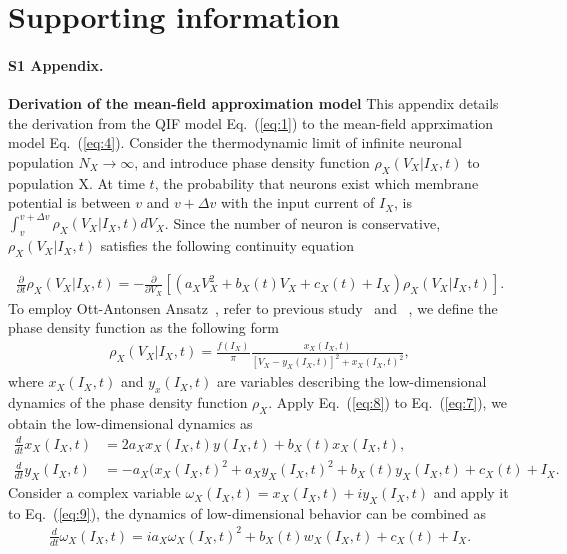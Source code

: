 \documentclass[10pt,letterpaper]{article}
\begin{document}
\section*{Supporting information}


\paragraph*{S1 Appendix.}
\label{S1_Appendix}
{\bf Derivation of the mean-field approximation model} This appendix details the derivation from the QIF model Eq.~(\ref{eq:1}) to the mean-field apprximation model Eq.~(\ref{eq:4}). Consider the thermodynamic limit of infinite neuronal population $N_{X}\xrightarrow{}\infty$, and introduce phase density function $\rho_{X}(V_{X}|I_{X},t)$ to population X. At time $t$, the probability that neurons exist which membrane potential is between $v$ and $v+\Delta v$ with the input current of $I_{X}$, is $\int_{v}^{v+\Delta v}\rho_{X}(V_{X}|I_{X},t)dV_{X}$. Since the number of neuron is conservative, $\rho_{X}(V_{X}|I_{X},t)$ satisfies the following continuity equation

\begin{eqnarray}
\label{eq:7}
    \frac{\partial}{\partial t}\rho_{X}(V_{X}|I_{X},t)=-\frac{\partial}{\partial V_{X}}\left[ \left( a_{X}V_{X}^{2} + b_{X}(t)V_{X} + c_{X}(t) + I_{X}\right) \rho_{X}(V_{X}|I_{X},t) \right].
\end{eqnarray}
To employ Ott-Antonsen Ansatz~\cite{ott2008}, refer to previous study~\cite{montbrio2015} and ~\cite{akao2019}, we define the phase density function as the following form
\begin{eqnarray}
\label{eq:8}
    \rho_{X}(V_{X}|I_{X},t) = \frac{f(I_{X})}{\pi}\frac{x_{X}(I_{X},t)}{\left[ V_{X}-y_{X}(I_{X},t)\right]^{2} + x_{X}(I_{X},t)^{2}},
\end{eqnarray}
where $x_{X}(I_{X},t)$ and $y_{x}(I_{X},t)$ are variables describing the low-dimensional dynamics of the phase density function $\rho_{X}$. Apply Eq.~(\ref{eq:8}) to Eq.~(\ref{eq:7}), we obtain the low-dimensional dynamics as
\begin{subequations}
\label{eq:9}
\begin{align}
    \frac{d}{dt}x_{X}(I_{X},t) &= 2a_{X}x_{X}(I_{X},t)y(I_{X},t) + b_{X}(t)x_{X}(I_{X},t), \label{eq:9a} \\
    \frac{d}{dt}y_{X}(I_{X},t) &= -a_{X}(x_{X}(I_{X},t)^{2} + a_{X}y_{X}(I_{X},t)^{2} + b_{X}(t)y_{X}(I_{X},t) + c_{X}(t) + I_{X}. \label{eq:9b}
\end{align}
\end{subequations}
Consider a complex variable $\omega_{X}(I_{X},t)=x_{X}(I_{X},t)+iy_{X}(I_{X},t)$ and apply it to Eq.~(\ref{eq:9}), the dynamics of low-dimensional behavior can be combined as
\begin{eqnarray}
\label{eq:10}
    \frac{d}{dt}\omega_{X}(I_{X},t) = ia_{X}\omega_{X}(I_{X},t)^{2} + b_{X}(t)w_{X}(I_{X},t) + c_{X}(t) + I_{X}.
\end{eqnarray}
\end{document}
